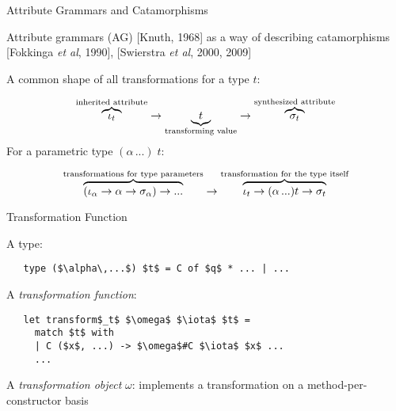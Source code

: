 \documentclass{beamer}
\theoremstyle{definition}
\theoremstyle{plain} %
\begin{document}
\begin{frame}[fragile]{Attribute Grammars and Catamorphisms}

  Attribute grammars (AG) [Knuth, 1968] as a way of describing catamorphisms [Fokkinga \emph{et al}, 1990], [Swierstra \emph{et al}, 2000, 2009]
  
  \vskip5mm
  
  A common shape of all transformations for a type $t$:

\[
\overbrace{\iota_t}^{\mbox{\scriptsize inherited attribute}} \to \underbrace{t}_{\mbox{\scriptsize transforming value}} \to \overbrace{\sigma_t}^{\mbox{\scriptsize{synthesized attribute}}}
\]
\vskip5mm
For a parametric type $(\alpha\,...)\;t$:

\[
\overbrace{(\iota_{\alpha} \to \alpha \to \sigma_{\alpha}) \to ...}^{\mbox{\scriptsize transformations for type parameters}}
\to \overbrace{\iota_t \to (\alpha\,...) t \to \sigma_t}^{\mbox{\scriptsize transformation for the type itself}}
\]

\end{frame}


\begin{comment}
  For given algebraic datatype $t$ we can define a single transformation function \lstinline|transform$_t$|. This
  function takes three arguments; two last ones are an inherited attribute and a subject (the data structure of type $t$). The first
  one is a \emph{transformation object}. This object represents the essense of the transformation on a method-per-constructor
  basis. The transformation function performs a pattern-matching on the subject and dispatched the control to the corresponding
  methods, passing as their arguments the matched sub-values and the inherited attribute. Note, the transformation function
  is not recursive, it performs a shallow traversal.
\end{comment}

\begin{frame}[fragile]{Transformation Function}

  A type:
  
\begin{lstlisting}
   type ($\alpha\,...$) $t$ = C of $q$ * ... | ...
\end{lstlisting}
\vskip5mm

A \emph{transformation function}:

\begin{lstlisting}
   let transform$_t$ $\omega$ $\iota$ $t$ =
     match $t$ with
     | C ($x$, ...) -> $\omega$#C $\iota$ $x$ ...
     ...
\end{lstlisting}
\vskip5mm

A \emph{transformation object} $\omega$: implements a transformation on a method-per-constructor basis
\vskip5mm
\end{frame}
\end{document}
